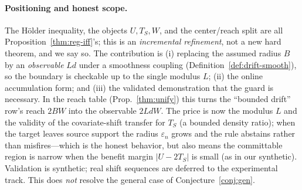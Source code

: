 \paragraph{Positioning and honest scope.} The H\"older inequality, the objects
$U,T_S,W$, and the center/reach split are all Proposition~\ref{thm:reg-iff}'s;
this is an \emph{incremental refinement}, not a new hard theorem, and we say so.
The contribution is (i) replacing the assumed radius $B$ by an \emph{observable}
$Ld$ under a smoothness coupling (Definition~\ref{def:drift-smooth}), so the
boundary is checkable up to the single modulus $L$; (ii) the online
accumulation form; and (iii) the validated demonstration that the guard is
necessary. In the reach table (Prop.~\ref{thm:unify}) this turns the
``bounded drift'' row's reach $2BW$ into the observable $2LdW$. The price is now
the modulus $L$ and the validity of the covariate-shift transfer for $T_S$ (a
bounded density ratio); when the target leaves source support the radius
$\varepsilon_n$ grows and the rule abstains rather than misfires---which is the
honest behavior, but also means the committable region is narrow when the benefit
margin $|U-2T_S|$ is small (as in our synthetic). Validation is synthetic; real
shift sequences are deferred to the experimental track. This does \emph{not}
resolve the general case of Conjecture~\ref{conj:gen}.
